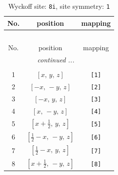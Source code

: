 \documentclass[fleqn,8pt]{jsarticle}
\begin{document}
\renewcommand{\arraystretch}{1.2}
\begin{longtable}{ccc}
\caption{Wyckoff site: {\tt 8i}, site symmetry: {\tt 1}}
 \\
 \hline \hline
No. & position & mapping \\ \hline \endfirsthead

\multicolumn{2}{l}{\tablename\ \thetable{}} \\
 \hline \hline
No. & position & mapping \\ \hline \endhead

 \hline \hline
\multicolumn{2}{r}{\footnotesize\it continued ...} \\ \endfoot

 \hline \hline
\multicolumn{2}{r}{} \\ \endlastfoot

1 & $\left[ x,\, y,\, z \right]$ & {\tt [1]} \\ \hline
2 & $\left[ - x,\, - y,\, z \right]$ & {\tt [2]} \\ \hline
3 & $\left[ - x,\, y,\, z \right]$ & {\tt [3]} \\ \hline
4 & $\left[ x,\, - y,\, z \right]$ & {\tt [4]} \\ \hline
5 & $\left[ x + \frac{1}{2},\, y,\, z \right]$ & {\tt [5]} \\ \hline
6 & $\left[ \frac{1}{2} - x,\, - y,\, z \right]$ & {\tt [6]} \\ \hline
7 & $\left[ \frac{1}{2} - x,\, y,\, z \right]$ & {\tt [7]} \\ \hline
8 & $\left[ x + \frac{1}{2},\, - y,\, z \right]$ & {\tt [8]} \\
\end{longtable}
\end{document}
